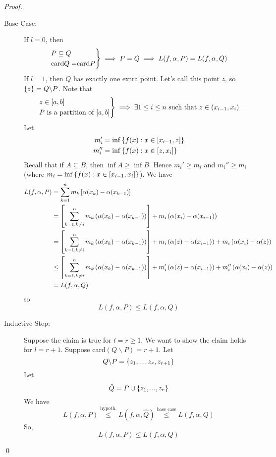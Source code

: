\begin{proof}
    \begin{description}
        \item[Base Case: ] If $l = 0$, then
        $$
            \begin{rcases*}
                P \subseteq Q \\
                \text{card$Q = $card$P$}
            \end{rcases*} \implies P = Q \implies L(f, \alpha, P) = L(f, \alpha, Q)
        $$
        If $l = 1$, then $Q$ has exactly one extra point. Let's call this point $z$, so $\left\{z\right\} = Q \backslash P$. Note that
        $$
            \begin{rcases*}
                z \in [a,b] \\
                \text{$P$ is a partition of $[a,b]$}
            \end{rcases*} \implies \exists 1 \leq i \leq n \st z \in (x_{i-1}, x_i)
        $$
        Let
        \begin{align*}
            m_i' &= \inf \left\{f(x) : x \in [x_{i-1}, z]\right\} \\
            m_i'' &= \inf \left\{f(x) : x \in [z, x_i]\right\}
        \end{align*}
        Recall that if $A \subseteq B$, then $\inf A \geq \inf B$. Hence $m_i' \geq m_i$ and $m_i'' \geq m_i$ (where $m_i = \inf \left\{f(x) : x \in [x_{i-1},x_i]\right\}$). We have
        \begin{align*}
            L(f, \alpha, P) &= \sum_{k=1}^{n}m_k \left[\alpha(x_{k})-\alpha(x_{k-1})\right] \\
            &= \left[\sum_{k=1, k\not = i}^{n}m_k \left(\alpha(x_{k})-\alpha(x_{k-1})\right)\right] + m_i \left(\alpha(x_{i})-\alpha(x_{i-1})\right) \\ 
            &= \left[\sum_{k=1, k\not = i}^{n}m_k \left(\alpha(x_{k})-\alpha(x_{k-1})\right)\right] + m_i \left(\alpha(z) - \alpha(x_{i-1})\right) + m_i \left(\alpha(x_i) - \alpha(z)\right) \\ 
            &\leq \left[\sum_{k=1, k\not = i}^{n}m_k \left(\alpha(x_{k})-\alpha(x_{k-1})\right)\right] + m_i' \left(\alpha(z) - \alpha(x_{i-1})\right) + m_i'' \left(\alpha(x_i) - \alpha(z)\right) \\
            &= L(f, \alpha, Q)
        \end{align*}
        so
        $$
        L(f, \alpha, P) \leq L(f, \alpha, Q)
        $$

        \item[Inductive Step: ] Suppose the claim is true for $l = r \geq 1.$ We want to show the claim holds for $l = r+1.$ Suppose card$(Q \backslash P) = r + 1.$ Let 
        $$
        Q\backslash P = \left\{z_1, ..., z_r, z_{r+1}\right\}
        $$
        Let
        $$
        \hat{Q} = P\cup \left\{z_1, ..., z_r\right\}
        $$
        We have
        $$
        L(f, \alpha, P) \overset{\text{hypoth.}}{\leq} L(f, \alpha, \hat{Q}) \overset{\text{base case}}{\leq} L(f, \alpha, Q)
        $$
        So,
        $$
        L(f, \alpha, P) \leq L(f, \alpha, Q)
        $$
    \end{description}
    \qed
\end{proof}

